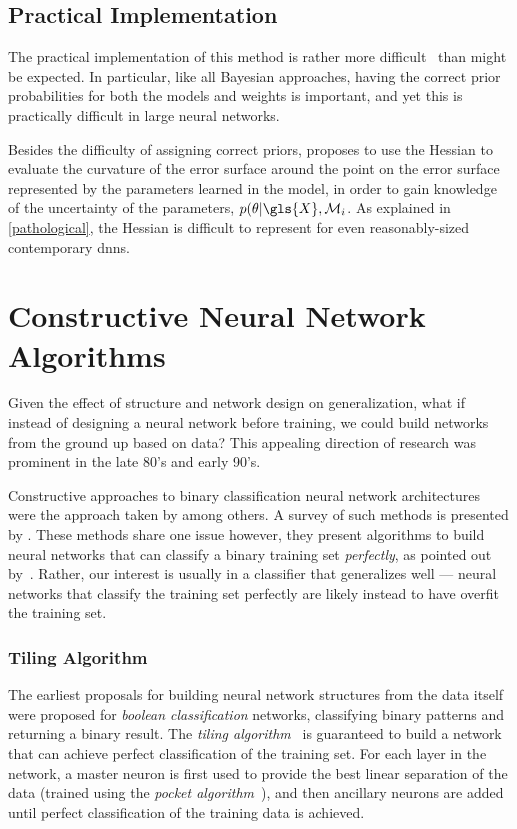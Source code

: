 \documentclass[thesis]{subfiles}
\begin{document}
\subsection{Practical Implementation}
The practical implementation of this method is rather more difficult~\citep{chipman2001} than might be expected. In particular, like all Bayesian approaches, having the correct prior probabilities for both the models and weights is important, and yet this is practically difficult in large neural networks.

Besides the difficulty of assigning correct priors, \citet{mackay1992practical} proposes to use the Hessian to evaluate the curvature of the error surface around the point on the error surface represented by the parameters learned in the model, in order to gain knowledge of the uncertainty of the parameters, \ie $p(\mathbf{\theta}|\gls{X},\mathcal{M}_i$. As explained in \cref{pathological}, the Hessian is difficult to represent for even reasonably-sized contemporary \glspl{dnn}.

\section{Constructive Neural Network Algorithms}
Given the effect of structure and network design on generalization, what if instead of designing a neural network before training, we could build networks from the ground up based on data? This appealing direction of research was prominent in the late 80's and early 90's.	

Constructive approaches to binary classification neural network architectures were the approach taken by \citet{mezard1989learning,Fahlman1989,frean1990upstart} among others. A survey of such methods is presented by \citet{parekh2000constructive}. These methods share one issue however, they  present algorithms to build neural networks that can classify a binary training set \emph{perfectly}, as pointed out by~\citet{Bishop1995}. Rather, our interest is usually in a classifier that generalizes well --- neural networks that classify the training set perfectly are likely instead to have overfit the training set.
	
	\subsubsection{Tiling Algorithm}\label{tilingalgo}
	The earliest proposals for building neural network structures from the data itself were proposed for \emph{boolean classification} networks, \ie classifying binary patterns and returning a binary result. The \emph{tiling algorithm}~\citep{mezard1989learning} is guaranteed to build a network that can achieve perfect classification of the training set. For each layer in the network, a master neuron is first used to provide the best linear separation of the data (trained using the \emph{pocket algorithm}~\citep{gallant1986optimal}), and then ancillary neurons are added until perfect classification of the training data is achieved. 
	
\end{document}
